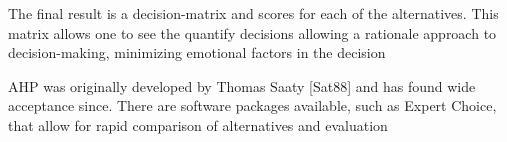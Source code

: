 The final result is a decision-matrix and scores for each of the
alternatives. This matrix allows one to see the quantify decisions
allowing a rationale approach to decision-making, minimizing emotional
factors in the decision

AHP was originally developed by Thomas Saaty {[}Sat88{]} and has found
wide acceptance since. There are software packages available, such as
Expert Choice, that allow for rapid comparison of alternatives and
evaluation
